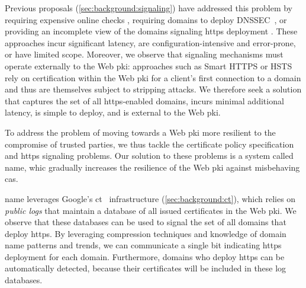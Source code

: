 Previous proposals (\autoref{sec:background:signaling}) have addressed this
problem by requiring expensive online checks , requiring
domains to deploy DNSSEC~\cite{rfc6698}, or providing an incomplete view of the
domains signaling \ac{https} deployment . These approaches incur significant latency, are
configuration-intensive and error-prone, or have limited scope. Moreover, we
observe that signaling mechanisms must operate externally to the Web \ac{pki}:
approaches such as Smart HTTPS or HSTS rely on certification within the Web
\ac{pki} for a client's first connection to a domain and thus are themselves
subject to stripping attacks. We therefore seek a solution that captures the set
of all \ac{https}-enabled domains, incurs minimal additional latency, is simple
to deploy, and is external to the Web \ac{pki}.


To address the problem of moving towards a Web \ac{pki} more resilient to the
compromise of trusted parties, we thus tackle the certificate policy
specification and \ac{https} signaling problems. Our solution to these problems
is a system called \ac{name}, whic gradually increases the resilience of the Web
\ac{pki} against misbehaving \acp{ca}.

\ac{name} leverages Google's \ac{ct}~\cite{rfc6698} infrastructure
(\autoref{sec:background:ct}), which relies on \emph{public logs} that maintain
a database of all issued certificates in the Web \ac{pki}. We observe that these
databases can be used to signal the set of all domains that deploy \ac{https}.
By leveraging compression techniques and knowledge of domain name patterns and
trends, we can communicate a single bit indicating \ac{https} deployment for
each domain. Furthermore, domains who deploy \ac{https} can be automatically
detected, because their certificates will be included in these log databases.

